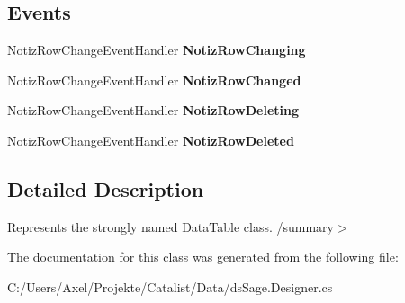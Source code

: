 \subsection*{Events}
\begin{DoxyCompactItemize}
\item 
Notiz\+Row\+Change\+Event\+Handler {\bfseries Notiz\+Row\+Changing}\hypertarget{class_products_1_1_data_1_1ds_sage_1_1_notiz_data_table_a4659df74acf789b2bb99491651a143a4}{}\label{class_products_1_1_data_1_1ds_sage_1_1_notiz_data_table_a4659df74acf789b2bb99491651a143a4}

\item 
Notiz\+Row\+Change\+Event\+Handler {\bfseries Notiz\+Row\+Changed}\hypertarget{class_products_1_1_data_1_1ds_sage_1_1_notiz_data_table_a5b91c3853b0125398d242404fa8409b5}{}\label{class_products_1_1_data_1_1ds_sage_1_1_notiz_data_table_a5b91c3853b0125398d242404fa8409b5}

\item 
Notiz\+Row\+Change\+Event\+Handler {\bfseries Notiz\+Row\+Deleting}\hypertarget{class_products_1_1_data_1_1ds_sage_1_1_notiz_data_table_a692d1c1a37f342d32e5ab8d29fa493e1}{}\label{class_products_1_1_data_1_1ds_sage_1_1_notiz_data_table_a692d1c1a37f342d32e5ab8d29fa493e1}

\item 
Notiz\+Row\+Change\+Event\+Handler {\bfseries Notiz\+Row\+Deleted}\hypertarget{class_products_1_1_data_1_1ds_sage_1_1_notiz_data_table_a69c6b347f0b6bc81da50b655c9af547e}{}\label{class_products_1_1_data_1_1ds_sage_1_1_notiz_data_table_a69c6b347f0b6bc81da50b655c9af547e}

\end{DoxyCompactItemize}


\subsection{Detailed Description}
Represents the strongly named Data\+Table class. /summary$>$ 

The documentation for this class was generated from the following file\+:\begin{DoxyCompactItemize}
\item 
C\+:/\+Users/\+Axel/\+Projekte/\+Catalist/\+Data/ds\+Sage.\+Designer.\+cs\end{DoxyCompactItemize}
